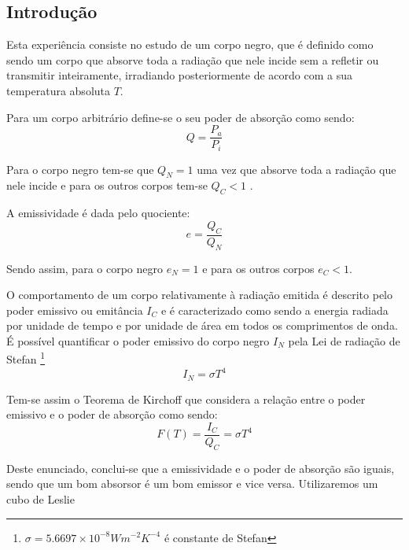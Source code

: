 \documentclass[9pt]{extarticle}
\begin{document}
\begin{multicols}{2}

\section{Introdução}

\par Esta experiência consiste no estudo de um corpo negro, que é definido como sendo um corpo que absorve toda a radiação que nele incide sem a refletir ou transmitir inteiramente, irradiando posteriormente de acordo com a sua temperatura absoluta $T$.

\par Para um corpo arbitrário define-se o seu poder de absorção como sendo:
\begin{equation}
Q = \frac{P_a}{P_i}
\end{equation}
\begin{center}
\par{}
\end{center}
\par Para o corpo negro tem-se que $Q_N = 1$ uma vez que absorve toda a radiação que nele incide e para os outros corpos tem-se $Q_C < 1$ .
\par A emissividade é dada pelo quociente:
\begin{equation}
e = \frac{Q_C}{Q_N}
\end{equation}
\par Sendo assim, para o corpo negro $e_N = 1$ e para os outros corpos $e_C < 1$.

\par O comportamento de um corpo relativamente à radiação emitida é descrito pelo poder emissivo ou emitância $I_C$ e é caracterizado como sendo a energia radiada por unidade de tempo e por unidade de área em todos os comprimentos de onda. É possível quantificar o poder emissivo do corpo negro $I_N$ pela Lei de radiação de Stefan \footnote{$\sigma=5.6697\times10^{-8}Wm^{-2}K^{-4}$ é constante de Stefan}
\begin{equation} \label{stefan}
I_N = \sigma T^4
\end{equation}  

\par Tem-se assim o Teorema de Kirchoff que considera a relação entre o poder emissivo e o poder de absorção como sendo:
\begin{equation}
F(T) = \frac{I_C}{Q_C} = \sigma T^4
\end{equation}
\par Deste enunciado, conclui-se que a emissividade e o poder de absorção são iguais, sendo que um bom absorsor é um bom emissor e vice versa. Utilizaremos um cubo de Leslie


\end{multicols}
\end{document}
